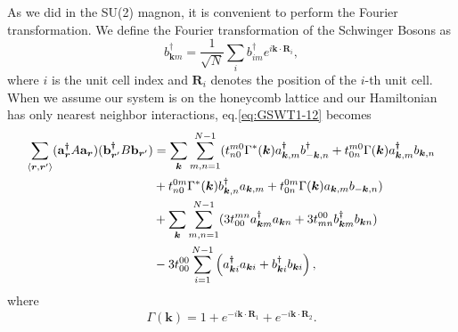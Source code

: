 \documentclass[11pt, aps, longbibliography]{article}
\begin{document}
As we did in the SU(2) magnon, it is convenient to perform the Fourier transformation.
We define the Fourier transformation of the Schwinger Bosons as 
\begin{equation}\label{eq:GSWT1-13}
    b_{\bm{k}m}^\dagger = \frac{1}{\sqrt{N}} \sum_{i}b_{im}^\dagger e^{i\bm{k}\cdot \bm{R}_i},
\end{equation}
where $i$ is the unit cell index and $\bm{R}_i$ denotes the position of the $i$-th unit cell.
When we assume our system is on the honeycomb lattice and our Hamiltonian has only nearest neighbor interactions, 
eq.\eqref{eq:GSWT1-12} becomes
\begin{align}\label{eq:GSWT1-14}
    \sum_{\langle \bm{r}, \bm{r}^\prime \rangle}(\mathbf{a}_{\bm{r}}^\dagger A\mathbf{a}_{\bm{r}})(\mathbf{b}_{\bm{r}^\prime}^\dagger B\mathbf{b}_{\bm{r}^\prime}) &= \sum_{\bm{k}}\sum_{m,n=1}^{N-1}(  t^{m0}_{n0} \Gamma^*(\bm{k}) a_{\bm{k},m}^\dagger b_{-\bm{k},n}^\dagger + t^{m0}_{0n} \Gamma(\bm{k}) a_{\bm{k},m}^\dagger b_{\bm{k},n}  \notag \\
    &+ t^{0m}_{n0} \Gamma^*(\bm{k})  b_{\bm{k},n}^\dagger a_{\bm{k},m} + t^{0m}_{0n} \Gamma(\bm{k}) a_{\bm{k},m}  b_{-\bm{k},n}  ) \notag \\
    &+ \sum_{\bm{k}}\sum_{m,n=1}^{N-1} (3t^{mn}_{00}a_{\bm{k}m}^\dagger a_{\bm{k}n} + 3t^{00}_{mn}b_{\bm{k}m}^\dagger b_{\bm{k}n}) \notag \\
    &- 3t^{00}_{00} \sum_{i=1}^{N-1} \left( a_{\bm{k}i}^\dagger a_{\bm{k}i} +b_{\bm{k}i}^\dagger b_{\bm{k}i} \right),
\end{align}
where 
\begin{equation}
    \Gamma(\bm{k}) = 1 + e^{-i\bm{k}\cdot \bm{R}_1} + e^{-i\bm{k}\cdot \bm{R}_2}.
\end{equation}
\end{document}
